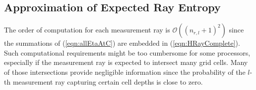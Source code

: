 \documentclass[letterpaper, 10pt]{ieeeconf}
\newcommand{\refeqn}[1]{(\ref{eqn:#1})}
\begin{document}
%


\subsection{Approximation of Expected Ray Entropy}

The order of computation for each measurement ray is $\mathcal O((n_{r,l}+1)^2)$ since the summations of \refeqn{allEtaAtC} are embedded in \refeqn{HRayComplete}. Such computational requirements might be too cumbersome for some processors, especially if the measurement ray is expected to intersect many grid cells. Many of those intersections provide negligible information since the probability of the $l$-th measurement ray capturing certain cell depths is close to zero.
\end{document}
